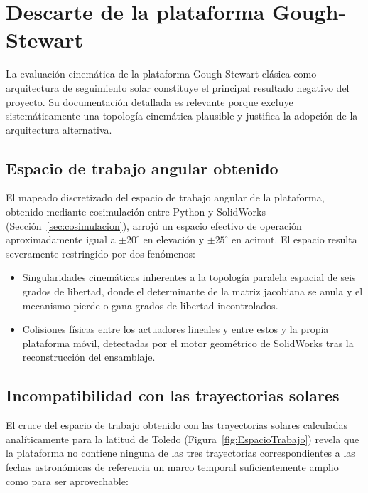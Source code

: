 \section{Descarte de la plataforma Gough-Stewart}
\label{sec:res_stewart}

La evaluación cinemática de la plataforma Gough-Stewart clásica como arquitectura de seguimiento solar constituye el principal resultado negativo del proyecto. Su documentación detallada es relevante porque excluye sistemáticamente una topología cinemática plausible y justifica la adopción de la arquitectura alternativa.

\subsection{Espacio de trabajo angular obtenido}

El mapeado discretizado del espacio de trabajo angular de la plataforma, obtenido mediante cosimulación entre Python y SolidWorks (Sección~\ref{sec:cosimulacion}), arrojó un espacio efectivo de operación aproximadamente igual a $\pm 20^{\circ}$ en elevación y $\pm 25^{\circ}$ en acimut. El espacio resulta severamente restringido por dos fenómenos:

\begin{itemize}
    \item Singularidades cinemáticas inherentes a la topología 
    paralela espacial de seis grados de libertad, donde el 
    determinante de la matriz jacobiana se anula y el mecanismo 
    pierde o gana grados de libertad incontrolados.
    \item Colisiones físicas entre los actuadores lineales y entre 
    estos y la propia plataforma móvil, detectadas por el motor 
    geométrico de SolidWorks tras la reconstrucción del ensamblaje.
\end{itemize}

\subsection{Incompatibilidad con las trayectorias solares}
El cruce del espacio de trabajo obtenido con las trayectorias solares calculadas analíticamente para la latitud de Toledo (Figura~\ref{fig:EspacioTrabajo}) revela que la plataforma no contiene ninguna de las tres trayectorias correspondientes a las fechas astronómicas de referencia un marco temporal suficientemente amplio como para ser aprovechable:

